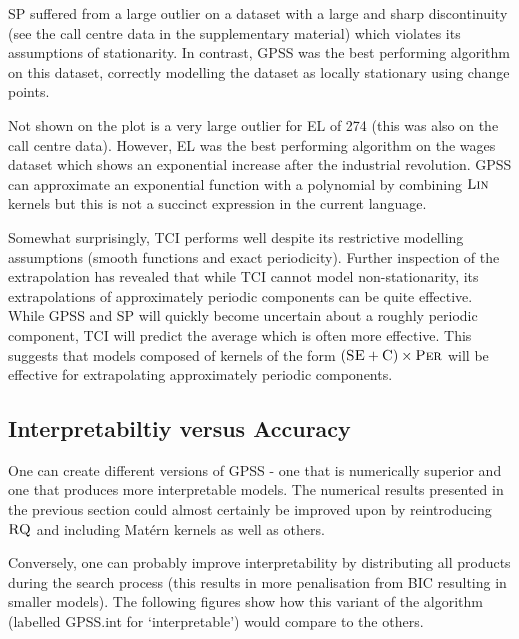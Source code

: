 \documentclass{article}
\begin{document}
SP suffered from a large outlier on a dataset with a large and sharp discontinuity (see the call centre data in the supplementary material) which violates its assumptions of stationarity.
In contrast, GPSS was the best performing algorithm on this dataset, correctly modelling the dataset as locally stationary using change points.

Not shown on the plot is a very large outlier for EL of 274 (this was also on the call centre data).
However, EL was the best performing algorithm on the wages dataset which shows an exponential increase after the industrial revolution.
GPSS can approximate an exponential function with a polynomial by combining ${\textsc{Lin}}$ kernels but this is not a succinct expression in the current language.

Somewhat surprisingly, TCI performs well despite its restrictive modelling assumptions (smooth functions and exact periodicity).
Further inspection of the extrapolation has revealed that while TCI cannot model non-stationarity, its extrapolations of approximately periodic components can be quite effective.
While GPSS and SP will quickly become uncertain about a roughly periodic component, TCI will predict the average which is often more effective.
This suggests that models composed of kernels of the form $({\textsc{SE}} + {\textsc{C}}) \times {\textsc{Per}}$ will be effective for extrapolating approximately periodic components.


\subsection{Interpretabiltiy versus Accuracy}

One can create different versions of GPSS - one that is numerically superior and one that produces more interpretable models.
The numerical results presented in the previous section could almost certainly be improved upon by reintroducing ${\textsc{RQ}}$ and including Mat\'ern kernels as well as others.

Conversely, one can probably improve interpretability by distributing all products during the search process (this results in more penalisation from BIC resulting in smaller models).
The following figures show how this variant of the algorithm (labelled GPSS.int for `interpretable') would compare to the others.
\end{document}
